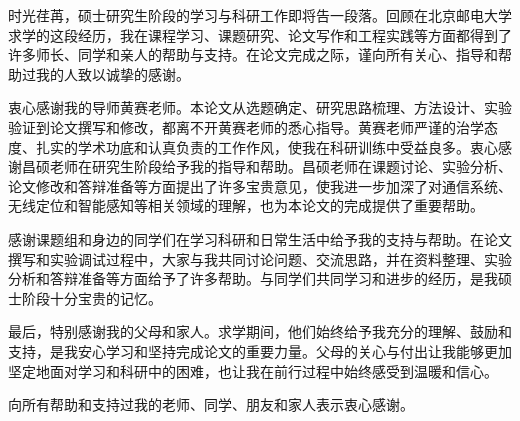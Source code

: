 \begin{acknowledgement}
时光荏苒，硕士研究生阶段的学习与科研工作即将告一段落。回顾在北京邮电大学求学的这段经历，我在课程学习、课题研究、论文写作和工程实践等方面都得到了许多师长、同学和亲人的帮助与支持。在论文完成之际，谨向所有关心、指导和帮助过我的人致以诚挚的感谢。

衷心感谢我的导师黄赛老师。本论文从选题确定、研究思路梳理、方法设计、实验验证到论文撰写和修改，都离不开黄赛老师的悉心指导。黄赛老师严谨的治学态度、扎实的学术功底和认真负责的工作作风，使我在科研训练中受益良多。衷心感谢昌硕老师在研究生阶段给予我的指导和帮助。昌硕老师在课题讨论、实验分析、论文修改和答辩准备等方面提出了许多宝贵意见，使我进一步加深了对通信系统、无线定位和智能感知等相关领域的理解，也为本论文的完成提供了重要帮助。

感谢课题组和身边的同学们在学习科研和日常生活中给予我的支持与帮助。在论文撰写和实验调试过程中，大家与我共同讨论问题、交流思路，并在资料整理、实验分析和答辩准备等方面给予了许多帮助。与同学们共同学习和进步的经历，是我硕士阶段十分宝贵的记忆。

最后，特别感谢我的父母和家人。求学期间，他们始终给予我充分的理解、鼓励和支持，是我安心学习和坚持完成论文的重要力量。父母的关心与付出让我能够更加坚定地面对学习和科研中的困难，也让我在前行过程中始终感受到温暖和信心。

向所有帮助和支持过我的老师、同学、朋友和家人表示衷心感谢。
\end{acknowledgement}
